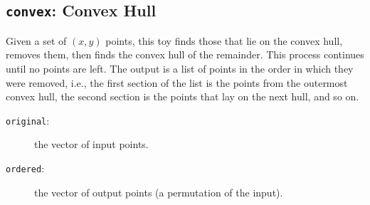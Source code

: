 \subsection{{\tt{convex}}: Convex Hull\label{s:toys-convex}}

Given a set of $(x,y)$ points,
this toy finds those that lie on the convex hull,
removes them,
then finds the convex hull of the remainder.
This process continues until no points are left.
The output is a list of points in the order in which they were removed,
i.e.,
the first section of the list is the points from the outermost convex hull,
the second section is the points that lay on the next hull, and so on.

{}

\begin{description}
\item[{\tt{original}}:]
	the vector of input points.
\end{description}

{\outputspec}

\begin{description}
\item[{\tt{ordered}}:]
	the vector of output points (a permutation of the input).
\end{description}
